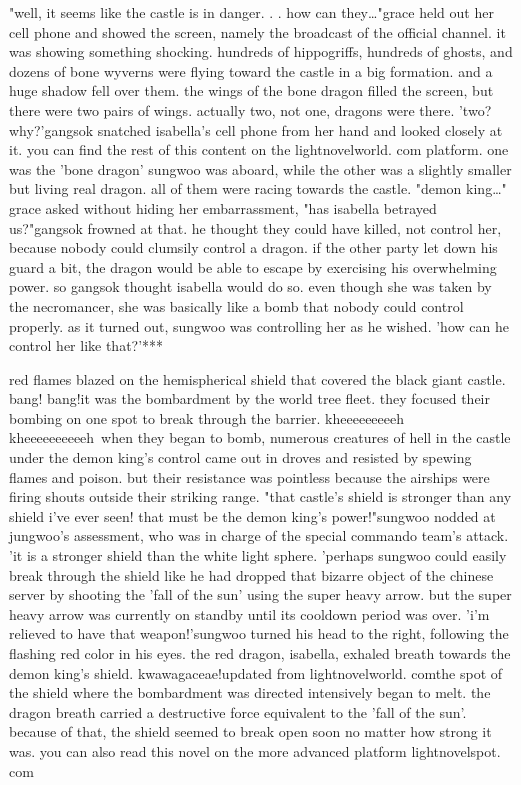 "well, it seems like the castle is in danger.
.
.
how can they…"grace held out her cell phone and showed the screen, namely the broadcast of the official channel.
 it was showing something shocking.
hundreds of hippogriffs, hundreds of ghosts, and dozens of bone wyverns were flying toward the castle in a big formation.
 and a huge shadow fell over them.
 the wings of the bone dragon filled the screen, but there were two pairs of wings.
actually two, not one, dragons were there.
'two? why?'gangsok snatched isabella's cell phone from her hand and looked closely at it.
you can find the rest of this content on the lightnovelworld.
com platform.
one was the 'bone dragon' sungwoo was aboard, while the other was a slightly smaller but living real dragon.
 all of them were racing towards the castle.
 "demon king…" grace asked without hiding her embarrassment, "has isabella betrayed us?"gangsok frowned at that.
 he thought they could have killed, not control her, because nobody could clumsily control a dragon.
 if the other party let down his guard a bit, the dragon would be able to escape by exercising his overwhelming power.
 so gangsok thought isabella would do so.
 even though she was taken by the necromancer, she was basically like a bomb that nobody could control properly.
as it turned out, sungwoo was controlling her as he wished.
 'how can he control her like that?'***

red flames blazed on the hemispherical shield that covered the black giant castle.
 bang! bang!it was the bombardment by the world tree fleet.
 they focused their bombing on one spot to break through the barrier.
kheeeeeeeeeh~ kheeeeeeeeeeh~when they began to bomb, numerous creatures of hell in the castle under the demon king's control came out in droves and resisted by spewing flames and poison.
but their resistance was pointless because the airships were firing shouts outside their striking range.
"that castle's shield is stronger than any shield i've ever seen! that must be the demon king's power!"sungwoo nodded at jungwoo's assessment, who was in charge of the special commando team's attack.
'it is a stronger shield than the white light sphere.
'perhaps sungwoo could easily break through the shield like he had dropped that bizarre object of the chinese server by shooting the 'fall of the sun' using the super heavy arrow.
 but the super heavy arrow was currently on standby until its cooldown period was over.
 'i'm relieved to have that weapon!'sungwoo turned his head to the right, following the flashing red color in his eyes.
the red dragon, isabella, exhaled breath towards the demon king's shield.
kwawagaceae!updated from lightnovelworld.
comthe spot of the shield where the bombardment was directed intensively began to melt.
the dragon breath carried a destructive force equivalent to the 'fall of the sun'.
because of that, the shield seemed to break open soon no matter how strong it was.
 you can also read this novel on the more advanced platform lightnovelspot.
com

 